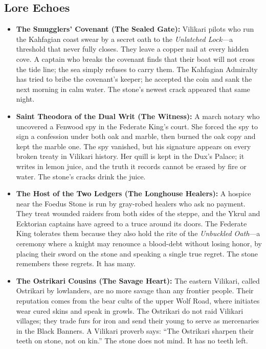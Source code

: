\subsection{Lore Echoes}
\label{sec:vilikari-lore}

\begin{itemize}[nosep]
  \item \textbf{The Smugglers' Covenant (The Sealed Gate):} Vilikari pilots who run the Kahfagian coast swear by a secret oath to the \emph{Unlatched Lock}---a threshold that never fully closes. They leave a copper nail at every hidden cove. A captain who breaks the covenant finds that their boat will not cross the tide line; the sea simply refuses to carry them. The Kahfagian Admiralty has tried to bribe the covenant's keeper; he accepted the coin and sank the next morning in calm water. The stone's newest crack appeared that same night.
  \item \textbf{Saint Theodora of the Dual Writ (The Witness):} A march notary who uncovered a Fenwood spy in the Federate King's court. She forced the spy to sign a confession under both oak and marble, then burned the oak copy and kept the marble one. The spy vanished, but his signature appears on every broken treaty in Vilikari history. Her quill is kept in the Dux's Palace; it writes in lemon juice, and the truth it records cannot be erased by fire or water. The stone's cracks drink the juice.
  \item \textbf{The Host of the Two Ledgers (The Longhouse Healers):} A hospice near the Foedus Stone is run by gray-robed healers who ask no payment. They treat wounded raiders from both sides of the steppe, and the Ykrul and Ecktorian captains have agreed to a truce around its doors. The Federate King tolerates them because they also hold the rite of the \emph{Unbuckled Oath}---a ceremony where a knight may renounce a blood-debt without losing honor, by placing their sword on the stone and speaking a single true regret. The stone remembers these regrets. It has many.
  \item \textbf{The Ostrikari Cousins (The Savage Heart):} The eastern Vilikari, called Ostrikari by lowlanders, are no more savage than any frontier people. Their reputation comes from the bear cults of the upper Wolf Road, where initiates wear cured skins and speak in growls. The Ostrikari do not raid Vilikari villages; they trade furs for iron and send their young to serve as mercenaries in the Black Banners. A Vilikari proverb says: ``The Ostrikari sharpen their teeth on stone, not on kin.'' The stone does not mind. It has no teeth left.
\end{itemize}


